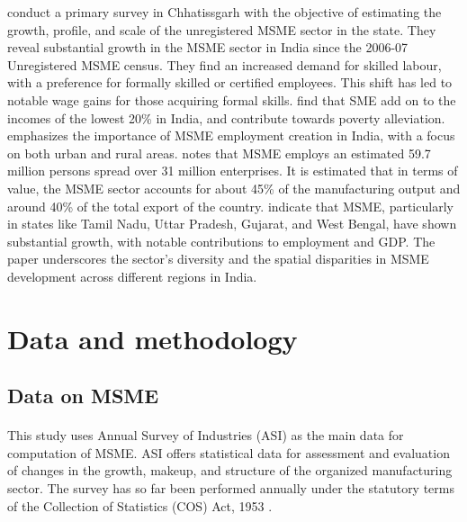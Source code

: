 \documentclass [12pt]{article}
\begin{document}
\textcite{sinha2017study} conduct a primary survey in Chhatissgarh with the objective of estimating the growth, profile, and scale of the unregistered MSME sector in the state. They reveal substantial growth in the  MSME sector in India since the 2006-07 Unregistered MSME census. They find an increased demand for skilled labour, with a preference for formally skilled or certified employees. This shift has led to notable wage gains for those acquiring formal skills. \textcite{manzoor2019role} find that SME add on to the incomes of the lowest 20\%  in India, and contribute towards poverty alleviation.  \textcite{purakala2020role} emphasizes the importance of MSME employment creation in India, with a focus on both urban and rural areas. \textcite{purakala2020role} notes that MSME employs an estimated 59.7 million persons spread over 31 million enterprises. It is estimated that in terms of value, the MSME sector accounts for about 45\% of the manufacturing output and around 40\% of the total export of the country.  \textcite{manna2017status} indicate that MSME, particularly in states like Tamil Nadu, Uttar Pradesh, Gujarat, and West Bengal, have shown substantial growth, with notable contributions to employment and GDP. The paper underscores the sector's diversity and the spatial disparities in MSME development across different regions in India.

\newpage
\section{Data and methodology}

\subsection{Data on MSME}
\paragraph{} This study uses Annual Survey of Industries (ASI) as the main data for computation of MSME. ASI offers statistical data for assessment and evaluation of changes in the growth, makeup, and structure of the organized manufacturing sector. The survey has so far been performed annually under the statutory terms of the Collection of Statistics (COS) Act, 1953 \parencite{labourbureau2018annual}. 
\end{document}
